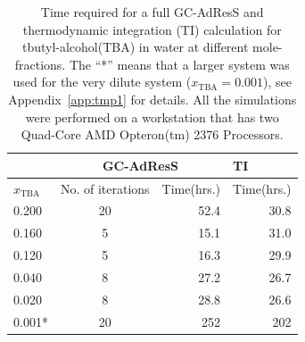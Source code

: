 \documentclass[a4paper,preprint,unsortedaddress]{revtex4-1}
\newcommand{\concenttba}{x_{\textrm{TBA}}}
\begin{document}
{\begin{table}[htpb]
\begin{center}
\begin{tabular}{|l|c|r|r|}
\hline
 &\multicolumn{2}{c|}{GC-AdResS}&\multicolumn{1}{l|}{TI}\\
 \hline
$\concenttba$ &No. of iterations&Time(hrs.)&Time(hrs.)\\
\hline
0.200 & 20 & 52.4 & 30.8 \\
0.160 & 5 & 15.1 & 31.0 \\
0.120 & 5 & 16.3 & 29.9 \\
0.040 & 8 & 27.2 & 26.7 \\
0.020 & 8 & 28.8 & 26.6 \\  
0.001* & 20 & 252 & 202 \\
\hline
\end{tabular}
\caption{Time required for a full GC-AdResS and thermodynamic
  integration (TI) calculation for tbutyl-alcohol(TBA) in water at
  different mole-fractions.
  The ``*'' means that a larger system was used for  the very dilute system ($\concenttba=0.001$), see Appendix~\ref{app:tmp1} for details.
  All the simulations were performed on a
  workstation that has two Quad-Core AMD Opteron(tm) 2376 Processors.
}
\label{table3}
\end{center}
\end{table}
}
\end{document}
